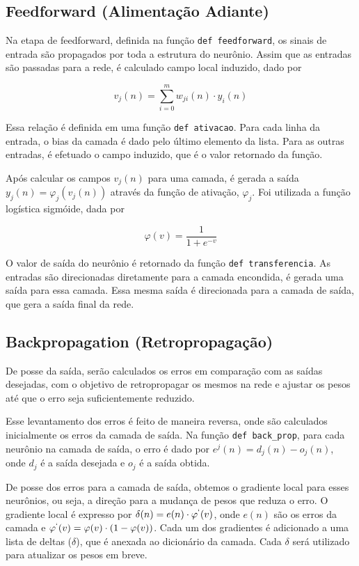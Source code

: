 \documentclass[12pt,a4paper]{article}
\begin{document}
\subsection{Feedforward (Alimentação Adiante)}

\qquad Na etapa de feedforward, definida na função \verb|def feedforward|, os sinais de entrada são propagados por toda a estrutura do neurônio. Assim que as entradas são passadas para a rede, é calculado campo local induzido, dado por 

$$v_j(n) = \sum_{i=0}^{m}w_{ji}(n)\cdot y_i(n)$$

\qquad Essa relação é definida em uma função \verb|def ativacao|. Para cada linha da entrada, o bias da camada é dado pelo último elemento da lista. Para as outras entradas, é efetuado o campo induzido, que é o valor retornado da função.

\qquad Após calcular os campos $v_j(n)$ para uma camada, é gerada a saída $y_j(n) = \varphi_j(v_j(n))$ através da função de ativação, $\varphi_j$. Foi utilizada a função logística sigmóide, dada por

$$ \varphi(v) = \dfrac{1}{1+e^{-v}}$$

O valor de saída do neurônio é retornado da função \verb|def transferencia|. As entradas são direcionadas diretamente para a camada encondida, é gerada uma saída para essa camada. Essa mesma saída é direcionada para a camada de saída, que gera a saída final da rede.\\

\subsection{Backpropagation (Retropropagação)}

\qquad De posse da saída, serão calculados os erros em comparação com as saídas desejadas, com o objetivo de retropropagar os mesmos na rede e ajustar os pesos até que o erro seja suficientemente reduzido.

\qquad Esse levantamento dos erros é feito de maneira reversa, onde são calculados inicialmente os erros da camada de saída. Na função \verb|def back_prop|, para cada neurônio na camada de saída, o erro é dado por $e^j(n) = d_j(n)-o_j(n)$, onde $d_j$ é a saída desejada e $o_j$ é a saída obtida.

\qquad De posse dos erros para a camada de saída, obtemos o gradiente local para esses neurônios, ou seja, a direção para a mudança de pesos que reduza o erro. O gradiente local é expresso por $\delta(n) = e(n)\cdot  \varphi^{`}(v)$, onde $e(n)$ são os erros da camada e $\varphi^{`}(v) = \varphi(v)\cdot (1 - \varphi(v))$. Cada um dos gradientes é adicionado a uma lista de deltas ($\delta$), que é anexada ao dicionário da camada. Cada $\delta$ será utilizado para atualizar os pesos em breve.
\end{document}
